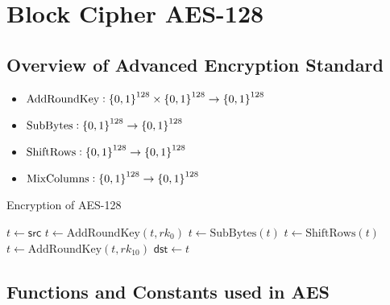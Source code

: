 \chapter{Block Cipher AES-128}

\section{Overview of Advanced Encryption Standard}

\begin{itemize}
	\item $\text{AddRoundKey}:\set{0,1}^{128}\times\set{0,1}^{128}\to\set{0,1}^{128}$
	\item $\text{SubBytes}:\set{0,1}^{128}\to\set{0,1}^{128}$
	\item $\text{ShiftRows}:\set{0,1}^{128}\to\set{0,1}^{128}$
	\item $\text{MixColumns}:\set{0,1}^{128}\to\set{0,1}^{128}$
\end{itemize}

\begin{algorithm}[H]
	\caption{Encryption of AES-128}
	
	\BlankLine
	$t \leftarrow \mathsf{src}$\;
	$t \leftarrow \text{AddRoundKey}(t, rk_0)$\;
	$t \leftarrow \text{SubBytes}(t)$\;
	$t \leftarrow \text{ShiftRows}(t)$\;
	$t \leftarrow \text{AddRoundKey}(t, rk_{10})$\;
	$\mathsf{dst} \leftarrow t$\;
	\;
\end{algorithm}

\newpage
\section{Functions and Constants used in AES}
